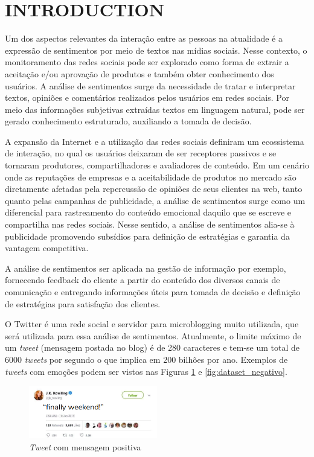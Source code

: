 \documentclass[conference]{IEEEtran}
\begin{document}
\section{INTRODUCTION}
Um dos aspectos relevantes da interação entre as pessoas na atualidade é a expressão de sentimentos por meio de textos nas mídias sociais. Nesse contexto, o monitoramento das redes sociais pode ser explorado como forma de extrair a aceitação e/ou aprovação de produtos e também obter conhecimento dos usuários. A análise de sentimentos surge da necessidade de tratar e interpretar textos, opiniões e comentários realizados pelos usuários em redes sociais. Por meio das informações subjetivas extraídas textos em linguagem natural, pode ser gerado conhecimento estruturado, auxiliando a tomada de decisão. 

A expansão da Internet e a utilização das redes sociais definiram um ecossistema de interação, no qual os usuários deixaram de ser receptores passivos e se tornaram produtores, compartilhadores e avaliadores de conteúdo. Em um cenário onde as reputações de empresas e a aceitabilidade de produtos no mercado são diretamente afetadas pela repercussão de opiniões de seus clientes na web, tanto quanto pelas campanhas de publicidade, a análise de sentimentos surge como um diferencial para rastreamento do conteúdo emocional daquilo que se escreve e compartilha nas redes sociais. Nesse sentido, a análise de sentimentos alia-se à publicidade promovendo subsídios para definição de estratégias e garantia da vantagem competitiva.

A análise de sentimentos ser aplicada na gestão de informação por exemplo, fornecendo feedback do cliente a partir do conteúdo dos diversos canais de comunicação e entregando informações úteis para tomada de decisão e definição de estratégias para satisfação dos clientes.

O Twitter\cite{twitter} é uma rede social e servidor para microblogging muito utilizada, que será utilizada para essa análise de sentimentos. Atualmente, o limite máximo de um \textit{tweet} (mensagem postada no blog) é de 280 caracteres e tem-se um total de 6000 \textit{tweets} por segundo o que implica em 200 bilhões por ano. Exemplos de \textit{tweets} com emoções podem ser vistos nas Figuras \ref{fig:dataset_positivo} e \ref{fig:dataset_negativo}.

\begin{figure}[htbp]
	\includegraphics[width=0.5\textwidth,center]{imgs/tweet_positivo.png}
	\caption{\textit{Tweet} com mensagem positiva}
	\label{fig:dataset_positivo}
\end{figure}
\end{document}
